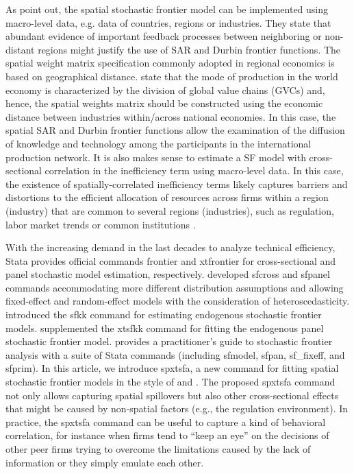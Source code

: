 As \cite{orea2019new} point out, the spatial stochastic frontier model can be implemented using macro-level data, e.g. data of countries, regions or industries. They state that abundant evidence of important feedback processes between neighboring or non-distant regions might justify the use of SAR and Durbin frontier functions. The spatial weight matrix specification commonly adopted in regional economics is based on geographical distance. \cite{liu2023industry} state that the mode of production in the world economy is characterized by the division of global value chains (GVCs) and, hence, the spatial weights matrix should be constructed using the economic distance between industries within/across national economies. In this case, the spatial SAR and Durbin frontier functions allow the examination of the diffusion of knowledge and technology among the participants in the international production network. It is also makes sense to estimate a SF model with cross-sectional correlation in the inefficiency term using macro-level data. In this case, the existence of spatially-correlated inefficiency terms likely captures barriers and distortions to the efficient allocation of resources across firms within a region (industry) that are common to several regions (industries), such as regulation, labor market trends or common institutions \citep{orea2023industry}.  


With the increasing demand in the last decades to analyze technical efficiency, Stata provides official commands frontier and xtfrontier for cross-sectional and panel stochastic model estimation, respectively. \cite{belotti2013stochastic} developed sfcross and sfpanel commands accommodating more different distribution assumptions and allowing fixed-effect and random-effect models with the consideration of heteroscedasticity. \cite{karakaplan2017fitting} introduced the sfkk command for estimating endogenous stochastic frontier models. \cite{mustafaugurkarakaplan2018xtsfkk} supplemented the xtsfkk command for fitting the endogenous panel stochastic frontier model. \cite{kumbhakarpractitioner} provides a practitioner’s guide to stochastic frontier analysis with a suite of Stata commands (including sfmodel, sfpan, sf\_fixeff, and sfprim).
 In this article, we introduce spxtsfa, a new command for fitting spatial stochastic frontier models in the style of \cite{orea2019new} and \cite{galli2022spatial}.  The proposed spxtsfa command not only allows capturing spatial spillovers but also other cross-sectional effects that might be caused by non-spatial factors (e.g., the regulation environment).  In practice, the spxtsfa command can be useful to capture a kind of behavioral correlation, for instance when firms tend to “keep an eye” on the decisions of other peer firms trying to overcome the limitations caused by the lack of information or they simply emulate each other.  


